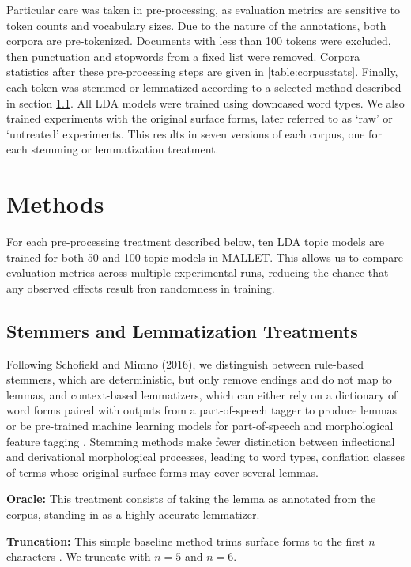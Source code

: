 \documentclass[11pt,a4paper]{article}
\begin{document}
Particular care was taken in pre-processing, as evaluation metrics are sensitive to token counts and vocabulary sizes. Due to the nature of the annotations, both corpora are pre-tokenized. Documents with less than 100 tokens were excluded, then punctuation and stopwords from a fixed list were removed. Corpora statistics after these pre-processing steps are given in \ref{table:corpusstats}. Finally, each token was stemmed or lemmatized according to a selected method described in section \ref{sec:stemmers}. All LDA models were trained using downcased word types. We also trained experiments with the original surface forms, later referred to as `raw' or `untreated' experiments. This results in seven versions of each corpus, one for each stemming or lemmatization treatment.


\section{Methods}
For each pre-processing treatment described below, ten LDA topic models are trained for both 50 and 100 topic models in MALLET. This allows us to compare evaluation metrics across multiple experimental runs, reducing the chance that any observed effects result fron randomness in training.


\subsection{Stemmers and Lemmatization Treatments}
\label{sec:stemmers}
Following Schofield and Mimno (2016), we distinguish between rule-based stemmers, which are deterministic, but only remove endings and do not map to lemmas, and context-based lemmatizers, which can either rely on a dictionary of word forms paired with outputs from a part-of-speech tagger to produce lemmas \cite{schofield-mimno-2016-comparing,Sharoff2011ThePP} or be pre-trained machine learning models for part-of-speech and morphological feature tagging \cite{qi2020stanza}. Stemming methods make fewer distinction between inflectional and derivational morphological processes, leading to word types, conflation classes of terms whose original surface forms may cover several lemmas.

\textbf{Oracle:} This treatment consists of taking the lemma as annotated from the corpus, standing in as a highly accurate lemmatizer.

\textbf{Truncation:} This simple baseline method trims surface forms to the first $n$ characters \cite{schofield-mimno-2016-comparing}. We truncate with $n=5$ and $n=6$.
\end{document}
